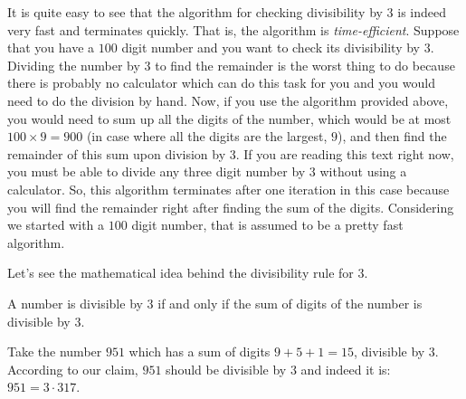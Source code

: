 \documentclass{subfile}
\begin{document}
It is quite easy to see that the algorithm for checking divisibility by $3$ is indeed very fast and terminates quickly. That is, the algorithm is \textit{time-efficient}. Suppose that you have a $100$ digit number and you want to check its divisibility by $3$. Dividing the number by $3$ to find the remainder is the worst thing to do because there is probably no calculator which can do this task for you and you would need to do the division by hand. Now, if you use the algorithm provided above, you would need to sum up all the digits of the number, which would be at most $100 \times 9 = 900$ (in case where all the digits are the largest, $9$), and then find the remainder of this sum upon division by $3$. If you are reading this text right now, you must be able to divide any three digit number by $3$ without using a calculator. So, this algorithm terminates after one iteration in this case because you will find the remainder right after finding the sum of the digits. Considering we started with a $100$ digit number, that is assumed to be a pretty fast algorithm.

Let's see the mathematical idea behind the divisibility rule for $3$.


	\begin{proposition}[Divisibility by $3$]
		A number is divisible by $3$ if and only if the sum of digits of the number is divisible by $3$.
	\end{proposition}

	\begin{example}
		Take the number $951$ which has a sum of digits $9+5+1=15$, divisible by $3$. According to our claim, $951$ should be divisible by $3$ and indeed it is: $951=3\cdot317$.
	\end{example}
\end{document}
